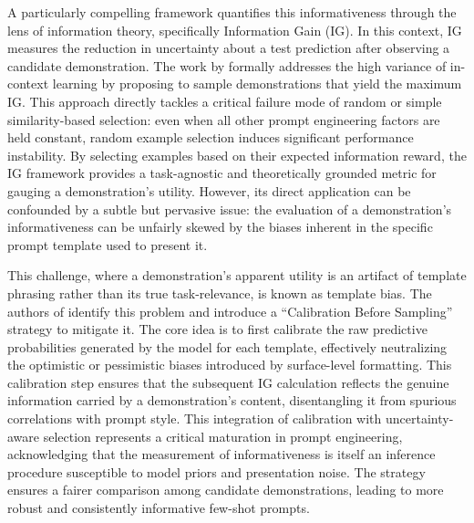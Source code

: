 \documentclass[11pt]{article}
\begin{document}
A particularly compelling framework quantifies this informativeness through the lens of information theory, specifically Information Gain (IG). In this context, IG measures the reduction in uncertainty about a test prediction after observing a candidate demonstration. The work by \cite{ref130} formally addresses the high variance of in-context learning by proposing to sample demonstrations that yield the maximum IG. This approach directly tackles a critical failure mode of random or simple similarity-based selection: even when all other prompt engineering factors are held constant, random example selection induces significant performance instability. By selecting examples based on their expected information reward, the IG framework provides a task-agnostic and theoretically grounded metric for gauging a demonstration's utility. However, its direct application can be confounded by a subtle but pervasive issue: the evaluation of a demonstration's informativeness can be unfairly skewed by the biases inherent in the specific prompt template used to present it.

This challenge, where a demonstration's apparent utility is an artifact of template phrasing rather than its true task-relevance, is known as template bias. The authors of \cite{ref130} identify this problem and introduce a ``Calibration Before Sampling'' strategy to mitigate it. The core idea is to first calibrate the raw predictive probabilities generated by the model for each template, effectively neutralizing the optimistic or pessimistic biases introduced by surface-level formatting. This calibration step ensures that the subsequent IG calculation reflects the genuine information carried by a demonstration's content, disentangling it from spurious correlations with prompt style. This integration of calibration with uncertainty-aware selection represents a critical maturation in prompt engineering, acknowledging that the measurement of informativeness is itself an inference procedure susceptible to model priors and presentation noise. The strategy ensures a fairer comparison among candidate demonstrations, leading to more robust and consistently informative few-shot prompts.
\end{document}
